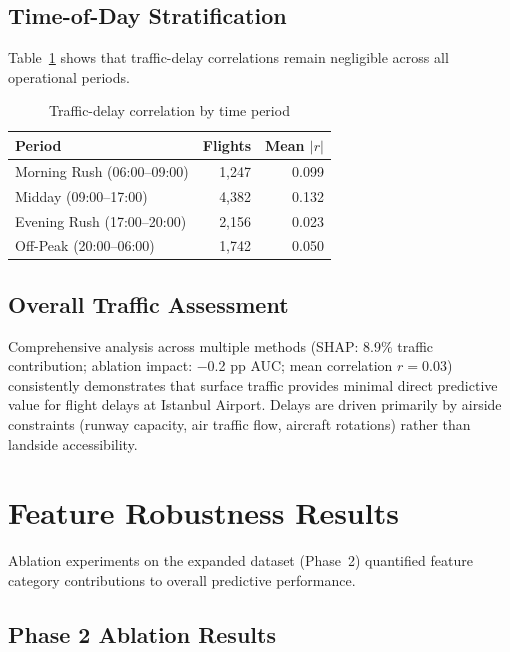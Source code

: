 \documentclass{report}
\begin{document}
\subsection{Time-of-Day Stratification}

Table~\ref{tab:traffic_tod} shows that traffic-delay correlations remain
negligible across all operational periods.

\begin{table}[H]
\centering
\caption{Traffic-delay correlation by time period}
\label{tab:traffic_tod}
\begin{tabular}{lrr}
\toprule
\textbf{Period} & \textbf{Flights} & \textbf{Mean $|r|$} \\
\midrule
Morning Rush (06:00--09:00) & 1,247 & 0.099 \\
Midday (09:00--17:00)       & 4,382 & 0.132 \\
Evening Rush (17:00--20:00) & 2,156 & 0.023 \\
Off-Peak (20:00--06:00)     & 1,742 & 0.050 \\
\bottomrule
\end{tabular}
\end{table}

\subsection{Overall Traffic Assessment}

Comprehensive analysis across multiple methods (SHAP: 8.9\% traffic
contribution; ablation impact: $-$0.2 pp AUC; mean correlation $r = 0.03$)
consistently demonstrates that surface traffic provides minimal direct
predictive value for flight delays at Istanbul Airport.  Delays are driven
primarily by airside constraints (runway capacity, air traffic flow, aircraft
rotations) rather than landside accessibility.

\section{Feature Robustness Results}
\label{sec:ablation}

Ablation experiments on the expanded dataset (Phase~2) quantified feature
category contributions to overall predictive performance.

\subsection{Phase 2 Ablation Results}
\end{document}
